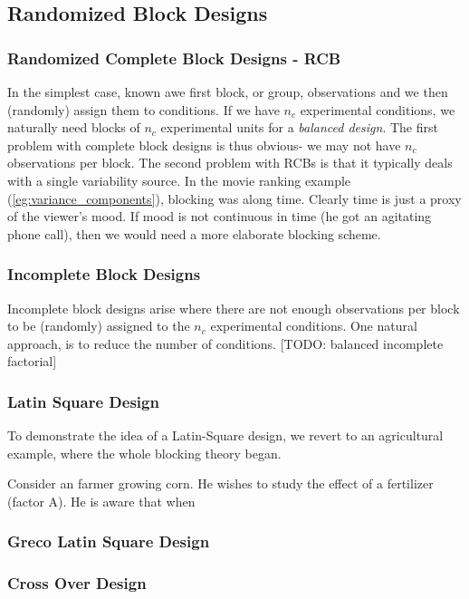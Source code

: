 \subsection{Randomized Block Designs}


\subsubsection{Randomized Complete Block Designs - RCB}
In the simplest case, known awe first block, or group, observations and we then (randomly) assign them to conditions.
If we have $n_c$ experimental conditions, we naturally need blocks of $n_c$ experimental units for a \emph{balanced design}.
The first problem with complete block designs is thus obvious- we may not have $n_c$ observations per block.
The second problem with RCBs is that it typically deals with a single variability source. 
In the movie ranking example (\ref{eg:variance_components}), blocking was along time. 
Clearly time is just a proxy of the viewer's mood. 
If mood is not continuous in time (he got an agitating phone call), then we would need a more elaborate blocking scheme.


\subsubsection{Incomplete Block Designs}
Incomplete block designs arise where there are not enough observations per block to be (randomly) assigned to the $n_c$ experimental conditions.
One natural approach, is to reduce the number of conditions. 
[TODO: balanced incomplete factorial]


\subsubsection{Latin Square Design}
To demonstrate the idea of a Latin-Square design, we revert to an agricultural example, where the whole blocking theory began.

\begin{example}
Consider an farmer growing corn.
He wishes to study the effect of a fertilizer (factor A).
He is aware that when 
\end{example}


\subsubsection{Greco Latin Square Design}


\subsubsection{Cross Over Design}


